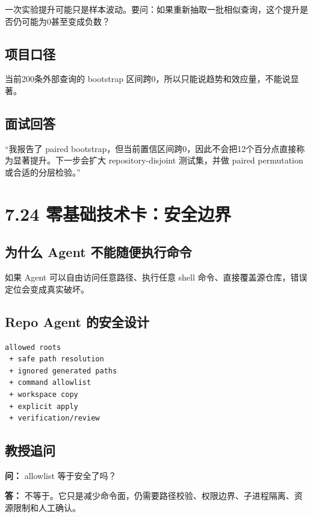 \documentclass[UTF8,12pt,openany]{ctexbook}
\begin{document}
一次实验提升可能只是样本波动。要问：如果重新抽取一批相似查询，这个提升是否仍可能为0甚至变成负数？\par

\subsection{项目口径}

当前200条外部查询的 bootstrap 区间跨0，所以只能说趋势和效应量，不能说显著。\par

\subsection{面试回答}

“我报告了 paired bootstrap，但当前置信区间跨0，因此不会把12个百分点直接称为显著提升。下一步会扩大 repository-disjoint 测试集，并做 paired permutation 或合适的分层检验。”\par

\section{7.24 零基础技术卡：安全边界}

\subsection{为什么 Agent 不能随便执行命令}

如果 Agent 可以自由访问任意路径、执行任意 shell 命令、直接覆盖源仓库，错误定位会变成真实破坏。\par

\subsection{Repo Agent 的安全设计}

\begin{lstlisting}
allowed roots
 + safe path resolution
 + ignored generated paths
 + command allowlist
 + workspace copy
 + explicit apply
 + verification/review
\end{lstlisting}

\subsection{教授追问}

\textbf{问：} allowlist 等于安全了吗？\par

\textbf{答：} 不等于。它只是减少命令面，仍需要路径校验、权限边界、子进程隔离、资源限制和人工确认。\par
\end{document}
